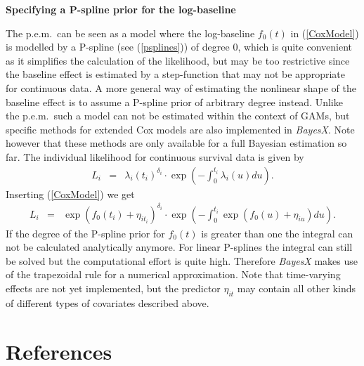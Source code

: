 \textbf{Specifying a P-spline prior for the log-baseline}

The p.e.m.~can be seen as a model where the log-baseline $f_0(t)$
in (\ref{CoxModel}) is modelled by a P-spline (see
(\ref{psplines})) of degree 0, which is quite convenient as it
simplifies the calculation of the likelihood, but may be too
restrictive since the baseline effect is estimated by a
step-function that may not be appropriate for continuous data. A
more general way of estimating the nonlinear shape of the baseline
effect is to assume a P-spline prior of arbitrary degree instead.
Unlike the p.e.m.~such a model can not be estimated within the
context of GAMs, but specific methods for extended Cox models are
also implemented in {\it BayesX}. Note however that these methods
are only available for a full Bayesian estimation so far. The
individual likelihood for continuous survival data is given by
\begin{eqnarray}\nonumber
L_i &=&\lambda_i(t_i)^{\delta_i}\cdot
\exp\left(-\int_{0}^{t_i}\lambda_i(u)du\right).
\end{eqnarray}
Inserting (\ref{CoxModel}) we get
\begin{eqnarray}\nonumber
L_i &=&\exp(f_0(t_i)+\eta_{i t_i})^{\delta_i}\cdot
\exp\left(-\int_{0}^{t_i}\exp(f_0(u)+\eta_{iu})du\right).
\end{eqnarray}
If the degree of the P-spline prior for $f_0(t)$ is greater than
one the integral can not be calculated analytically anymore. For
linear P-splines the integral can still be solved but the
computational effort is quite high. Therefore {\it BayesX} makes
use of the trapezoidal rule for a numerical approximation. Note
that time-varying effects are not yet implemented, but the
predictor $\eta_{it}$ may contain all other kinds of different
types of covariates described above.


\section{References}
\label{bayesregref}

